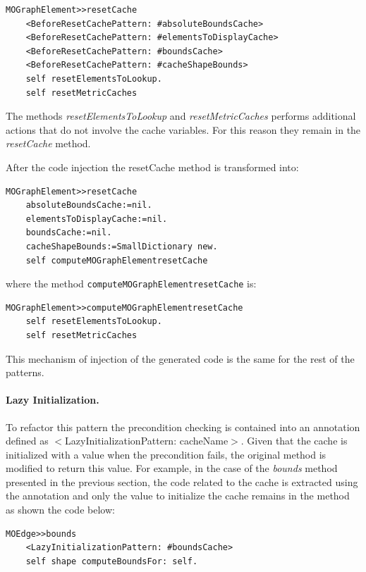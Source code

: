 \documentclass[preprint,10pt]{sigplanconf}
\newcommand{\ct}{\lstinline[backgroundcolor=\color{white},basicstyle=\footnotesize\ttfamily]}
\begin{document}
\begin{lstlisting} 
MOGraphElement>>resetCache 
	<BeforeResetCachePattern: #absoluteBoundsCache> 
	<BeforeResetCachePattern: #elementsToDisplayCache>
	<BeforeResetCachePattern: #boundsCache> 
	<BeforeResetCachePattern: #cacheShapeBounds> 
	self resetElementsToLookup. 
	self resetMetricCaches
\end{lstlisting}

The methods \emph{resetElementsToLookup} and \emph{resetMetricCaches} performs additional actions that do not involve the cache variables. For this reason they remain in the \emph{resetCache} method.

After the code injection the resetCache method is transformed into:

\begin{lstlisting} 
MOGraphElement>>resetCache 
	absoluteBoundsCache:=nil.
	elementsToDisplayCache:=nil. 
	boundsCache:=nil. 
	cacheShapeBounds:=SmallDictionary new. 
	self computeMOGraphElementresetCache 
\end{lstlisting}

where the method \ct{computeMOGraphElementresetCache} is:

\begin{lstlisting} 
MOGraphElement>>computeMOGraphElementresetCache
	self resetElementsToLookup. 
	self resetMetricCaches 
\end{lstlisting}

This mechanism of injection of the generated code is the same for
the rest of the patterns.

\paragraph{Lazy Initialization.} To refactor this pattern
the precondition checking is contained into an annotation defined as
$<$LazyInitializationPattern: cacheName$>$. Given that
the cache is initialized with a value when the precondition fails,
the original method is modified to return this value. For example,
in the case of the \emph{bounds} method presented in the previous
section, the code related to the cache is extracted using the annotation
and only the value to initialize the cache remains in the method as
shown the code below:

\begin{lstlisting} 
MOEdge>>bounds 
	<LazyInitializationPattern: #boundsCache> 
	self shape computeBoundsFor: self. 
\end{lstlisting}
\end{document}
